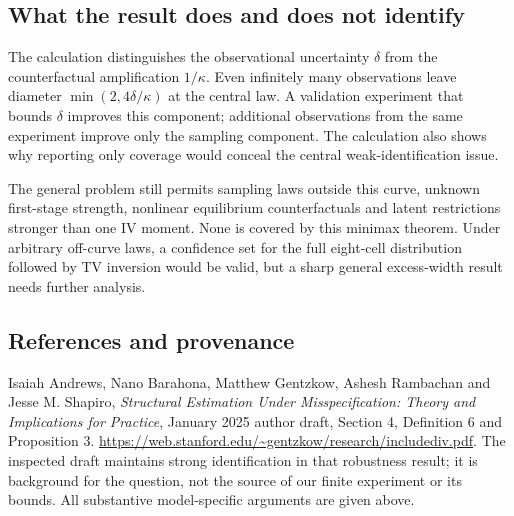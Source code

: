 \documentclass[11pt,a4paper]{article}
\begin{document}
\subsection*{What the result does and does not identify}
The calculation distinguishes the observational uncertainty $\delta$ from the counterfactual amplification $1/\kappa$. Even infinitely many observations leave diameter $\min(2,4\delta/\kappa)$ at the central law. A validation experiment that bounds $\delta$ improves this component; additional observations from the same experiment improve only the sampling component. The calculation also shows why reporting only coverage would conceal the central weak-identification issue.

The general problem still permits sampling laws outside this curve, unknown first-stage strength, nonlinear equilibrium counterfactuals and latent restrictions stronger than one IV moment. None is covered by this minimax theorem. Under arbitrary off-curve laws, a confidence set for the full eight-cell distribution followed by TV inversion would be valid, but a sharp general excess-width result needs further analysis.

\subsection*{References and provenance}
Isaiah Andrews, Nano Barahona, Matthew Gentzkow, Ashesh Rambachan and Jesse M. Shapiro, \emph{Structural Estimation Under Misspecification: Theory and Implications for Practice}, January 2025 author draft, Section 4, Definition 6 and Proposition 3. \url{https://web.stanford.edu/~gentzkow/research/includediv.pdf}. The inspected draft maintains strong identification in that robustness result; it is background for the question, not the source of our finite experiment or its bounds. All substantive model-specific arguments are given above.
\end{document}
